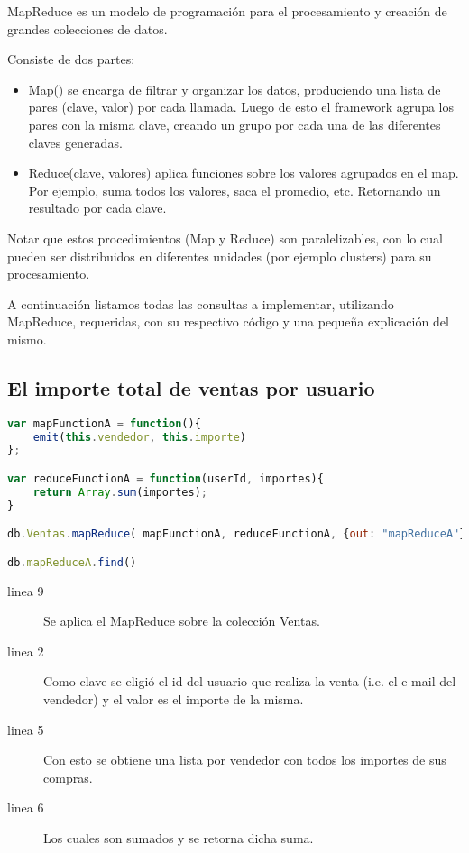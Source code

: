 MapReduce es un modelo de programación para el procesamiento y creación de grandes colecciones de datos.

Consiste de dos partes:
\begin{itemize}
 \item Map() se encarga de filtrar y organizar los datos, produciendo una lista de pares (clave, valor) por cada llamada. Luego de esto el framework agrupa los pares con la misma clave, creando un grupo por cada una de las diferentes claves generadas.
 \item Reduce(clave, valores) aplica funciones sobre los valores agrupados en el map. Por ejemplo, suma todos los valores, saca el promedio, etc. Retornando un resultado por cada clave.
\end{itemize}

Notar que estos procedimientos (Map y Reduce) son paralelizables, con lo cual pueden ser distribuidos en diferentes unidades (por ejemplo clusters) para su procesamiento.

A continuación listamos todas las consultas a implementar, utilizando MapReduce, requeridas, con su respectivo código y una pequeña explicación del mismo.

\subsection{El importe total de ventas por usuario}

\begin{lstlisting}[language=JavaScript]
var mapFunctionA = function(){
	emit(this.vendedor, this.importe)
};

var reduceFunctionA = function(userId, importes){
	return Array.sum(importes);
}

db.Ventas.mapReduce( mapFunctionA, reduceFunctionA, {out: "mapReduceA"} )

db.mapReduceA.find()
\end{lstlisting}

\begin{description}
 \item[linea 9] Se aplica el MapReduce sobre la colección Ventas.
 \item[linea 2] Como clave se eligió el id del usuario que realiza la venta (i.e. el e-mail del vendedor) y el valor es el importe de la misma.
 \item[linea 5] Con esto se obtiene una lista por vendedor con todos los importes de sus compras.
 \item[linea 6] Los cuales son sumados y se retorna dicha suma.
\end{description}

